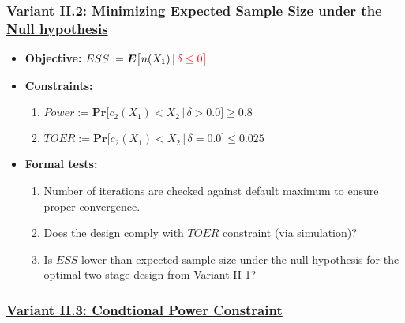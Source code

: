 \documentclass[]{book}
\providecommand{\tightlist}{%
  \setlength{\itemsep}{0pt}\setlength{\parskip}{0pt}}
\begin{document}
\hypertarget{variant-ii.2-minimizing-expected-sample-size-under-the-null-hypothesis}{%
\subsubsection{\texorpdfstring{\protect\hyperlink{variantII_2}{Variant II.2: Minimizing Expected Sample Size under the Null hypothesis}}{Variant II.2: Minimizing Expected Sample Size under the Null hypothesis}}\label{variant-ii.2-minimizing-expected-sample-size-under-the-null-hypothesis}}

\begin{itemize}
\tightlist
\item
  \textbf{Objective:} \(ESS := \boldsymbol{E}\big[n(X_1)\,|\,\color{red}{\delta\leq 0}\big]\)
\item
  \textbf{Constraints:}

  \begin{enumerate}
  \def\labelenumi{\arabic{enumi}.}
  \tightlist
  \item
    \(Power := \boldsymbol{Pr}\big[c_2(X_1) < X_2\,|\,\delta> 0.0\big] \geq 0.8\)
  \item
    \(TOER := \boldsymbol{Pr}\big[c_2(X_1) < X_2\,|\,\delta=0.0\big] \leq 0.025\)
  \end{enumerate}
\item
  \textbf{Formal tests:}

  \begin{enumerate}
  \def\labelenumi{\arabic{enumi}.}
  \tightlist
  \item
    Number of iterations are checked against default maximum to ensure proper
    convergence.
  \item
    Does the design comply with \(TOER\) constraint (via simulation)?
  \item
    Is \(ESS\) lower than expected sample size under the null hypothesis
    for the optimal two stage design from Variant II-1?
  \end{enumerate}
\end{itemize}

\hypertarget{variant-ii.3-condtional-power-constraint}{%
\subsubsection{\texorpdfstring{\protect\hyperlink{variantII_3}{Variant II.3: Condtional Power Constraint}}{Variant II.3: Condtional Power Constraint}}\label{variant-ii.3-condtional-power-constraint}}
\end{document}
